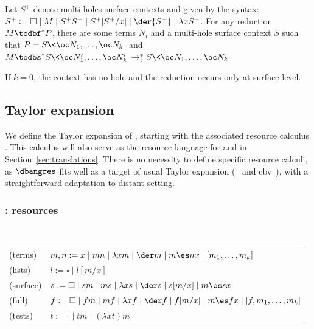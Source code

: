 \begin{corollary}[Standardization]\label{cor:standardisation_dbang}
	Let $S^+$ denote multi-holes surface contexts and given by the syntax:
	$
		S^+:= \square\mid M\mid	S^+S^+\mid S^+[S^+/x]\mid \der{S^+}\mid \lambda xS^+
	$.
	For any reduction $M\todbf^* P$, there are some terms $N_i$ and a
	multi-hole surface context $S$ such that $P=S\<\oc N_1,\dots ,\oc N_k\>$ and
	$
		M\todbs^*S\<\oc N_1',\dots ,\oc N_k'\>\to_i^*S\<\oc N_1,\dots ,\oc N_k\>
	$
\end{corollary}
If $k=0$,  the context has no hole and the reduction occurs only at surface level.


\subsection{Taylor expansion}
\label{subsec:taylor-dbang}


We define the Taylor expansion of \dbang{}, starting with the associated resource calculus \dbangres.
This calculus will also serve as the resource language for \dcbn{} and \dcbv{} in
Section~\ref{sec:translations}.	There is no necessity to define specific resource calculi, as
$\dbangres$ fits well as a target 
of usual Taylor expansion (\cbn{}~\cite{ER08} and
cbv{}~\cite{ehrhard:Collapsing}), with a straightforward
adaptation to distant setting.

\subsubsection{\dbang{}: resources}
\label{subsubsec:dbang-ressources}

\begin{definition}~
	\label{def:dbang-taylor-terms-and-ctxs}

	\begin{tabular}{ll}
	(terms) & $m,n: = x\mid mn\mid \lambda xm \mid  \der m \mid m\es nx\mid
	[m_1,\dots ,m_k]$ \\

	(lists) & $l:= \square \mid l[m/x]$ \\

	(surface) & $s:= \square \mid sm \mid ms \mid \lambda x s \mid
	\der s \mid s[m/x] \mid	m\es sx$\\
	
	(full) & $f:= \square \mid fm \mid mf \mid \lambda x f \mid
	\der f \mid f[m/x] \mid	m\es fx\mid [f,m_1,\dots ,m_k]$\\

	(tests)& $t:= \square \mid tm \mid (\lambda x t)m$
	\end{tabular}
\end{definition}

